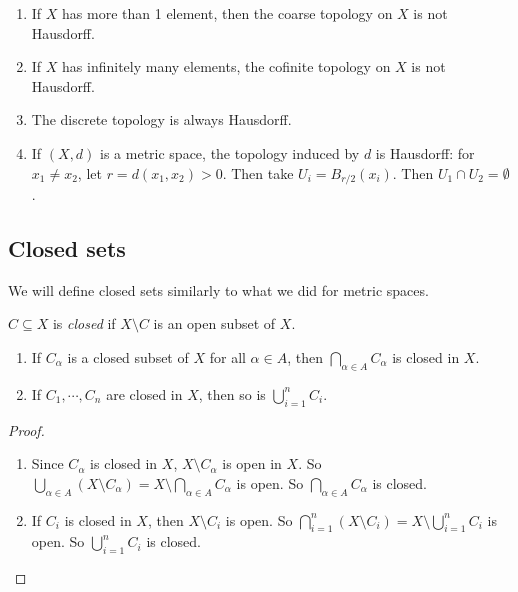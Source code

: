 \documentclass[a4paper]{article}
\begin{document}
\begin{eg}\leavevmode
  \begin{enumerate}
    \item If $X$ has more than 1 element, then the coarse topology on $X$ is not Hausdorff.
    \item If $X$ has infinitely many elements, the cofinite topology on $X$ is not Hausdorff.
    \item The discrete topology is always Hausdorff.
    \item If $(X, d)$ is a metric space, the topology induced by $d$ is Hausdorff: for $x_1 \not= x_2$, let $r = d(x_1, x_2) > 0$. Then take $U_i = B_{r/2}(x_i)$. Then $U_1 \cap U_2 = \emptyset$.
  \end{enumerate}
\end{eg}

\subsection{Closed sets}
We will define closed sets similarly to what we did for metric spaces.

\begin{defi}
  $C\subseteq X$ is \emph{closed} if $X\setminus C$ is an open subset of $X$.
\end{defi}

\begin{lemma}\leavevmode
  \begin{enumerate}
    \item If $C_\alpha$ is a closed subset of $X$ for all $\alpha \in A$, then $\bigcap_{\alpha \in A} C_\alpha$ is closed in $X$.
    \item If $C_1, \cdots, C_n$ are closed in $X$, then so is $\bigcup_{i = 1}^n C_i$.
  \end{enumerate}
\end{lemma}

\begin{proof}\leavevmode
  \begin{enumerate}
    \item Since $C_\alpha$ is closed in $X$, $X \setminus C_\alpha$ is open in $X$. So $\bigcup_{\alpha\in A}(X\setminus C_\alpha) = X\setminus \bigcap_{\alpha\in A}C_\alpha$ is open. So $\bigcap_{\alpha \in A}C_\alpha$ is closed.

    \item If $C_i$ is closed in $X$, then $X\setminus C_i$ is open. So $\bigcap_{i = 1}^n (X\setminus C_i) = X\setminus \bigcup_{i = 1}^n C_i$ is open. So $\bigcup_{i = 1}^n C_i$ is closed.
  \end{enumerate}
\end{proof}
\end{document}

